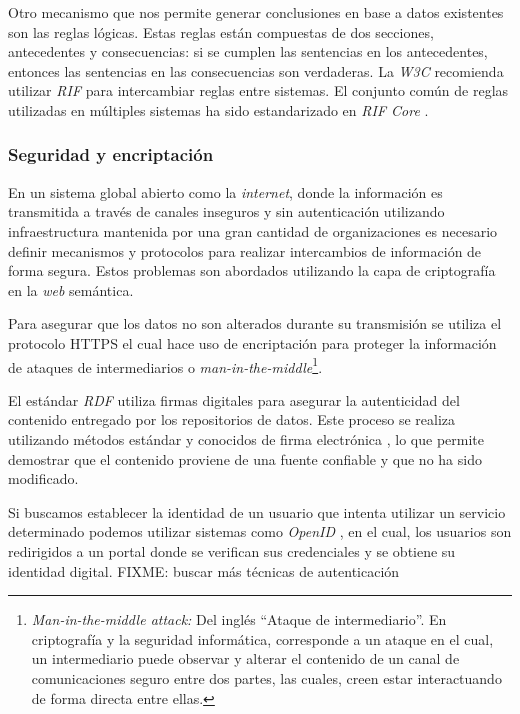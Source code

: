 Otro mecanismo que nos permite generar conclusiones en base a datos existentes
son las reglas lógicas. Estas reglas están compuestas de dos secciones,
antecedentes y consecuencias: si se cumplen las sentencias en los antecedentes,
entonces las sentencias en las consecuencias son verdaderas. La \textit{W3C}
recomienda utilizar \textit{RIF} \cite{kifer2013rif} para intercambiar reglas
entre sistemas. El conjunto común de reglas utilizadas en múltiples sistemas ha
sido estandarizado en \textit{RIF Core} \cite{boley2010rif}.

\subsubsection{Seguridad y encriptación}

En un sistema global abierto como la \textit{internet}, donde la información es
transmitida a través de canales inseguros y sin autenticación utilizando
infraestructura mantenida por una gran cantidad de organizaciones es necesario
definir mecanismos y protocolos para realizar intercambios de información de
forma segura. Estos problemas son abordados utilizando la capa de criptografía
en la \textit{web} semántica.

Para asegurar que los datos no son alterados durante su transmisión se utiliza
el protocolo HTTPS \cite{rescorla2000rfc2818} el cual hace uso de encriptación
para proteger la información de ataques de intermediarios o
\textit{man-in-the-middle}\footnote{\textit{Man-in-the-middle attack:} Del
inglés ``Ataque de intermediario''. En criptografía y la seguridad informática,
corresponde a un ataque en el cual, un intermediario puede observar y alterar el
contenido de un canal de comunicaciones seguro entre dos partes, las cuales,
creen estar interactuando de forma directa entre ellas.}.

El estándar \textit{RDF} utiliza firmas digitales para asegurar la autenticidad
del contenido entregado por los repositorios de datos. Este proceso se realiza
utilizando métodos estándar y conocidos de firma electrónica
\cite{carroll2003signing}, lo que permite demostrar que el contenido proviene de
una fuente confiable y que no ha sido modificado.

Si buscamos establecer la identidad de un usuario que intenta utilizar un
servicio determinado podemos utilizar sistemas como \textit{OpenID}
\cite{recordon2006openid}, en el cual, los usuarios son redirigidos a un portal
donde se verifican sus credenciales y se obtiene su identidad digital. FIXME:
buscar más técnicas de autenticación

